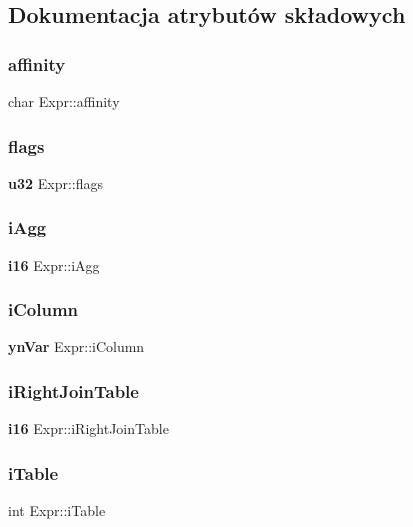 \subsection{Dokumentacja atrybutów składowych}
\mbox{\label{struct_expr_aeb51b76e606d6fbae234e38473bf3dc9}} 
\subsubsection{affinity}
{\footnotesize\ttfamily char Expr\+::affinity}

\mbox{\label{struct_expr_aebac9ee7e6aa7adca63969d3ba8d0ded}} 
\subsubsection{flags}
{\footnotesize\ttfamily \textbf{ u32} Expr\+::flags}

\mbox{\label{struct_expr_a9fe0ed6360b0a4cf5b67ab8def922033}} 
\subsubsection{iAgg}
{\footnotesize\ttfamily \textbf{ i16} Expr\+::i\+Agg}

\mbox{\label{struct_expr_ad19251a8eb6db3cf0bdffe0dcb07eeba}} 
\subsubsection{iColumn}
{\footnotesize\ttfamily \textbf{ yn\+Var} Expr\+::i\+Column}

\mbox{\label{struct_expr_aa49b76f3628a7bf2b0997c33461cc651}} 
\subsubsection{iRightJoinTable}
{\footnotesize\ttfamily \textbf{ i16} Expr\+::i\+Right\+Join\+Table}

\mbox{\label{struct_expr_af8e273f4d7d173bfb5996ed09054611c}} 
\subsubsection{iTable}
{\footnotesize\ttfamily int Expr\+::i\+Table}

